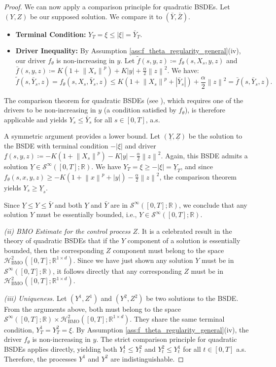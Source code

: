 \documentclass[qian]{imsart}
\newcommand{\R}{\mathbb{R}}
\newcommand{\norm}[1]{\left\lVert#1\right\rVert}
\newcommand{\abs}[1]{\left\lvert#1\right\rvert}
\theoremstyle{plain}
\theoremstyle{definition}
\begin{document}
\begin{proof}
We can now apply a comparison principle for quadratic BSDEs. Let $(Y,Z)$ be our supposed solution. We compare it to $(\bar{Y}, \bar{Z})$.
\begin{itemize}
    \item \textbf{Terminal Condition:} $Y_T = \xi \le \abs{\xi} = \bar{Y}_T$.
    \item \textbf{Driver Inequality:} By Assumption \ref{ass:f_theta_regularity_general}(iv), our driver $f_\theta$ is non-increasing in $y$. Let $\tilde{f}(s,y,z) \coloneqq f_\theta(s,X_s,y,z)$ and $\bar{f}(s,y,z) \coloneqq K(1+\norm{X_s}^p) + K\abs{y} + \frac{\alpha}{2}\norm{z}^2$. We have:
    \[ \tilde{f}(s, \bar{Y}_s, z) = f_\theta(s, X_s, \bar{Y}_s, z) \le K(1+\norm{X_s}^p + \abs{\bar{Y}_s}) + \frac{\alpha}{2}\norm{z}^2 = \bar{f}(s, \bar{Y}_s, z). \]
\end{itemize}
The comparison theorem for quadratic BSDEs (see \cite{Kobylanski2000}), which requires one of the drivers to be non-increasing in $y$ (a condition satisfied by $f_\theta$), is therefore applicable and yields $Y_s \le \bar{Y}_s$ for all $s \in [0,T]$, a.s.

A symmetric argument provides a lower bound. Let $(\underline{Y}, \underline{Z})$ be the solution to the BSDE with terminal condition $-\abs{\xi}$ and driver $\underline{f}(s,y,z) \coloneqq -K(1+\norm{X_s}^p) - K\abs{y} - \frac{\alpha}{2}\norm{z}^2$. Again, this BSDE admits a solution $\underline{Y} \in \mathcal{S}^{\infty}([0,T]; \R)$. We have $Y_T = \xi \ge -\abs{\xi} = \underline{Y}_T$, and since $f_\theta(s,x,y,z) \ge -K(1+\norm{x}^p+\abs{y}) - \frac{\alpha}{2}\norm{z}^2$, the comparison theorem yields $Y_s \ge \underline{Y}_s$.

Since $\underline{Y} \le Y \le \bar{Y}$ and both $\underline{Y}$ and $\bar{Y}$ are in $\mathcal{S}^{\infty}([0,T]; \R)$, we conclude that any solution $Y$ must be essentially bounded, i.e., $Y \in \mathcal{S}^{\infty}([0,T]; \R)$.

\emph{(ii) BMO Estimate for the control process $Z$.}
It is a celebrated result in the theory of quadratic BSDEs \cite{Kobylanski2000} that if the $Y$ component of a solution is essentially bounded, then the corresponding $Z$ component must belong to the space $\mathcal{H}^2_{\mathrm{BMO}}([0,T]; \R^{1 \times d})$. Since we have just shown any solution $Y$ must be in $\mathcal{S}^{\infty}([0,T]; \R)$, it follows directly that any corresponding $Z$ must be in $\mathcal{H}^2_{\mathrm{BMO}}([0,T]; \R^{1 \times d})$.

\emph{(iii) Uniqueness.}
Let $(Y^1, Z^1)$ and $(Y^2, Z^2)$ be two solutions to the BSDE. From the arguments above, both must belong to the space $\mathcal{S}^{\infty}([0,T]; \R) \times \mathcal{H}^2_{\mathrm{BMO}}([0,T]; \R^{1 \times d})$. They share the same terminal condition, $Y^1_T = Y^2_T = \xi$.
By Assumption \ref{ass:f_theta_regularity_general}(iv), the driver $f_\theta$ is non-increasing in $y$. The strict comparison principle for quadratic BSDEs \cite{Kobylanski2000} applies directly, yielding both $Y^1_t \le Y^2_t$ and $Y^2_t \le Y^1_t$ for all $t \in [0,T]$ a.s. Therefore, the processes $Y^1$ and $Y^2$ are indistinguishable.


\end{proof}
\end{document}
